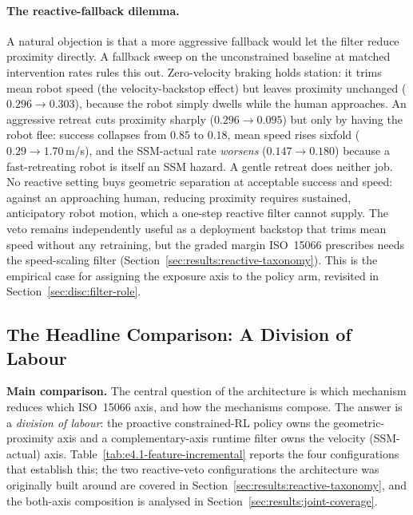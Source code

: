 \documentclass[11pt,a4paper]{report}
\newcommand{\ssm}{SSM}
\newcommand{\iso}{ISO~15066}
\begin{document}
\paragraph{The reactive-fallback dilemma.}
A natural objection is that a more aggressive fallback would let the
filter reduce proximity directly. A fallback sweep on the
unconstrained baseline at matched intervention rates rules this out.
Zero-velocity braking holds station: it trims mean robot speed (the
velocity-backstop effect) but leaves proximity unchanged
($0.296 \to 0.303$), because the robot simply dwells while the human
approaches. An aggressive retreat cuts proximity sharply
($0.296 \to 0.095$) but only by having the robot flee: success
collapses from $0.85$ to $0.18$, mean speed rises sixfold
($0.29 \to 1.70$\,m/s), and the \ssm{}-actual rate \emph{worsens}
($0.147 \to 0.180$) because a fast-retreating robot is itself an
\ssm{} hazard. A gentle retreat does neither job. No reactive
setting buys geometric separation at acceptable success and speed:
against an approaching human, reducing proximity requires sustained,
anticipatory robot motion, which a one-step reactive filter cannot
supply. The veto remains independently useful as a deployment
backstop that trims mean speed without any retraining, but the
graded margin \iso{} prescribes needs the speed-scaling filter
(Section~\ref{sec:results:reactive-taxonomy}). This is the empirical
case for assigning the exposure axis to the policy arm, revisited in
Section~\ref{sec:disc:filter-role}.

\subsection{The Headline Comparison: A Division of Labour}
\label{sec:results:headline-feature-table}

\textbf{Main comparison.} The central question of the
architecture is which mechanism reduces which \iso{} axis, and how the
mechanisms compose. The answer is a \emph{division of labour}: the
proactive constrained-RL policy owns the geometric-proximity axis and a
complementary-axis runtime filter owns the velocity (\ssm{}-actual)
axis. Table~\ref{tab:e4.1-feature-incremental} reports the four
configurations that establish this; the two reactive-veto
configurations the architecture was originally built around are
covered in Section~\ref{sec:results:reactive-taxonomy}, and the
both-axis composition is analysed in
Section~\ref{sec:results:joint-coverage}.
\end{document}
